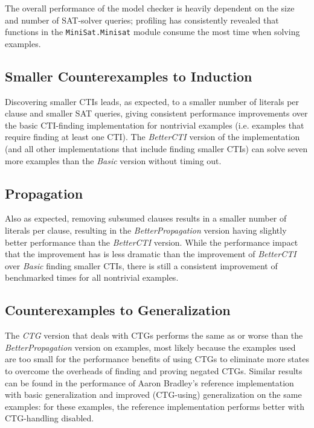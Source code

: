 \documentclass[12pt,a4paper,twoside,openright]{report}
\begin{document}
{The overall performance of the model checker is heavily dependent on the size and number of SAT-solver queries;
profiling has consistently revealed that functions in the \verb,MiniSat.Minisat, module consume the most time
when solving examples.

\subsection{Smaller Counterexamples to Induction}

Discovering smaller CTIs leads, as expected, to a smaller number of literals per clause and smaller SAT queries,
giving consistent performance improvements over the basic CTI-finding implementation for nontrivial
examples (i.e. examples that require finding at least one CTI). The \emph{BetterCTI} version of the implementation
(and all other implementations that include finding smaller CTIs)
can solve seven more examples than the \emph{Basic} version without timing out.

\subsection{Propagation}

Also as expected, removing subsumed clauses results in a smaller number of literals per clause, resulting in
the \emph{BetterPropagation} version having slightly better performance than the \emph{BetterCTI} version.
While the performance impact that the improvement has is less dramatic than the improvement of \emph{BetterCTI}
over \emph{Basic} finding smaller CTIs, there is still a consistent improvement of benchmarked times for all
nontrivial examples.

\subsection{Counterexamples to Generalization}

The \emph{CTG} version that deals with CTGs performs the same as or worse than the \emph{BetterPropagation} version
on examples, most likely because the examples used are too small for the performance benefits of using CTGs to
eliminate more states to overcome the overheads of finding and proving negated CTGs. Similar results can be found
in the performance of Aaron Bradley's reference implementation with basic generalization and
improved (CTG-using) generalization on the same examples: for these examples, the reference implementation performs
better with CTG-handling disabled.

}
\end{document}
